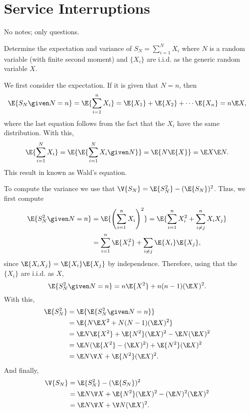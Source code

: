 \section{Service Interruptions}
\label{sec:serv-interr}

No notes; only questions.

\begin{question}
  Determine the expectation and variance of $S_N = \sum_{i=1}^N X_i$
  where $N$ is a random variable (with finite second moment) and
  $\{X_i\}$ are i.i.d. as the generic random variable $X$.
\begin{solution}
We first consider the
expectation.  If it is given that $N=n$, then
\begin{equation*}
  \E{S_N \given N=n} =  \E{\sum_{i=1}^n X_i}= \E{X_1} + \E{X_2} + \cdots \E{X_n} = n \E X,
\end{equation*}
where the last equation follows from the fact that the $X_i$ have the same distribution. With this, 
\begin{equation*}
  \E{\sum_{i=1}^N X_i} =   \E{\E{\sum_{i=1}^N X_i \given N}} =  \E{N\E{X}} = \E X \E N.
\end{equation*}
This result in known as Wald's equation. 

To compute the variance we use that $\V{S_N} =\E{S_N^2} - (\E{S_N})^2$. Thus, we first compute
\begin{equation*}
  \begin{split}
  \E{ S_N^2 \given  N=n} 
&=  \E{\left(\sum_{i=1}^n X_i\right)^2}  
=  \E{\sum_{i=1}^n X_i^2 + \sum_{i\neq j}^n X_i X_j}  \\
&= \sum_{i=1}^n \E{X^2_i} + \sum_{i \neq j} \E{X_i} \E{X_j},
  \end{split}
\end{equation*}
since $\E{X_iX_j} = \E{X_i} \E{X_j}$ by independence. Therefore, using
that the $\{X_i\}$ are i.i.d. as $X$,
\begin{equation*}
  \E{ S_N^2 \given N=n} = n \E{X^2} + n(n-1) (\E X)^2. 
\end{equation*}
With this, 
\begin{equation*}
  \begin{split}
  \E{ S_N^2}  &= \E{\E{ S_N^2 \given N=n}}  \\
&= \E{N \E X^2 + N(N-1)(\E X)^2 } \\
& = \E N \E{ X^2} + \E{N^2} (\E X)^2 - \E N (\E X)^2 \\
& = \E N (\E{ X^2}  - (\E X)^2) + \E{N^2} (\E X)^2 \\
& = \E N \V X + \E{N^2} (\E X)^2.
  \end{split}
\end{equation*}
And finally,
\begin{equation}
  \begin{split}
  \V{S_N} 
&= \E{S_N^2}  - (\E{S_N})^2 \\
&= \E N \V X + \E{N^2} (\E X)^2   - (\E N)^2 (\E X)^2 \\
&= \E N \V X + \V N (\E X)^2.
  \end{split}
\end{equation}

\end{solution}
\end{question}


